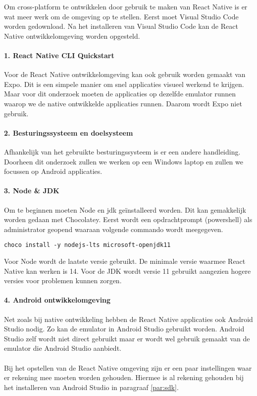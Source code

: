 Om cross-platform te ontwikkelen door gebruik te maken van React Native is er wat meer werk om 
de omgeving op te stellen. Eerst moet Visual Studio Code worden gedownload. 
Na het installeren van Visual Studio Code kan de React Native ontwikkelomgeving worden opgesteld. 

\paragraph{1. React Native CLI Quickstart}
Voor de React Native ontwikkelomgeving kan ook gebruik worden gemaakt van Expo. 
Dit is een simpele manier om snel applicaties visueel werkend te krijgen. 
Maar voor dit onderzoek moeten de applicaties op dezelfde emulator runnen waarop we de native 
ontwikkelde applicaties runnen. Daarom wordt Expo niet gebruik.

\paragraph{2. Besturingssysteem en doelsysteem}
Afhankelijk van het gebruikte besturingssysteem is er een andere handleiding. 
Doorheen dit onderzoek zullen we werken op een Windows laptop en zullen we focussen op Android applicaties.

\paragraph{3. Node \& JDK}
Om te beginnen moeten \Gls{Node} en \acrshort{jdk} geïnstalleerd worden. Dit kan gemakkelijk 
worden gedaan met \Gls{Chocolatey}. Eerst wordt een 
opdrachtprompt (powershell) als administrator geopend waaraan volgende commando wordt meegegeven.
\begin{verbatim}
choco install -y nodejs-lts microsoft-openjdk11
\end{verbatim}
Voor Node wordt de laatste versie gebruikt. De minimale versie waarmee React Native kan werken is 14. 
Voor de JDK wordt versie 11 gebruikt aangezien hogere versies voor problemen kunnen zorgen.

\paragraph{4. Android ontwikkelomgeving}
Net zoals bij native ontwikkeling hebben de React Native applicaties ook Android Studio nodig. 
Zo kan de emulator in Android Studio gebruikt worden. 
Android Studio zelf wordt niet direct gebruikt maar er wordt wel gebruik gemaakt van de 
emulator die Android Studio aanbiedt.
\\\\
Bij het opstellen van de React Native omgeving zijn er een paar instellingen waar er rekening 
mee moeten worden gehouden. Hiermee is al rekening gehouden bij het installeren van Android Studio 
in paragraaf \ref{par:sdk}.

